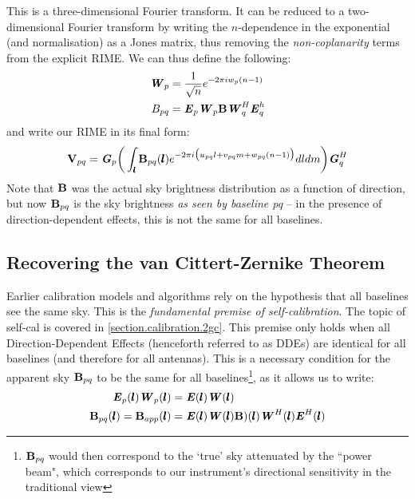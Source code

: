 \pg
This is a three-dimensional Fourier transform. It can be reduced to a two-dimensional Fourier transform by writing the $n$-dependence in the exponential (and normalisation) as a Jones matrix, thus removing the \emph{non-coplanarity} terms from the explicit RIME. We can thus define the following:
\begin{align}
\textbf{\emph{W}}_p &= \frac{1}{\sqrt{n}}e^{-2\pi i w_p(n-1)}\\
B_{pq}    &= \textbf{\emph{E}}_p \textbf{\emph{W}}_p \textbf{B} \textbf{\emph{W}}_q^H \textbf{\emph{E}}_q^h
\end{align}
and write our RIME in its final form:
\begin{equation}\label{eq.vis.FT.coherency.matrix}
\textbf{V}_{pq} = \textbf{\emph{G}}_p \bigg(\int_{\pmb{l}} \textbf{B}_{pq}(\pmb{l}) e^{-2\pi i\big(u_{pq}l+v_{pq}m+w_{pq}(n-1)\big)} dl dm \bigg) \textbf{\emph{G}}_q^H
\end{equation}
\pg
Note that $\textbf{B}$ was the actual sky  brightness distribution as a function of direction, but now $\textbf{B}_{pq}$ is the sky brightness \emph{as seen by baseline pq} -- in the presence of direction-dependent effects, this is not the same for all baselines.\\

\subsection{Recovering the van Cittert-Zernike Theorem}
\label{section.RIME.FullSky.CVZ}

\pg
Earlier calibration models and algorithms rely on the hypothesis that all baselines see the same sky. This is the \emph{fundamental premise of self-calibration}. The topic of self-cal is covered in \cref{section.calibration.2gc}. This premise only holds when all Direction-Dependent Effects (henceforth referred to as DDEs) are identical for all baselines (and therefore for all antennas). This is a necessary condition for the apparent sky $\textbf{B}_{pq}$ to be the same for all baselines\footnote{$\textbf{B}_{pq}$ would then correspond to the `true' sky attenuated by the ``power beam", which corresponds to our instrument's directional sensitivity in the traditional view}, as it allows us to write:
\begin{align}
\textbf{\emph{E}}_p(\pmb{l}) \textbf{\emph{W}}_p(\pmb{l})&= \textbf{\emph{E}}(\pmb{l}) \textbf{\emph{W}}(\pmb{l})\\
\textbf{B}_{pq}(\pmb{l}) = \textbf{B}_{app}(\pmb{l}) &= \textbf{\emph{E}}(\pmb{l}) \textbf{\emph{W}}(\pmb{l}) \textbf{B})(\pmb{l}) \textbf{\emph{W}}^H(\pmb{l}) \textbf{\emph{E}}^H(\pmb{l})
\end{align}


